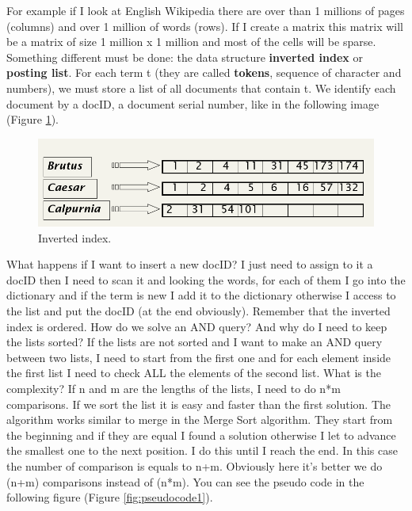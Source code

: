 For example if I look at English Wikipedia there are over than 1 millions of pages (columns) and over 1 million of words (rows). If I create a matrix this matrix will be a matrix of size 1 million x 1 million and most of the cells will be sparse.\newline
Something different must be done: the data structure \textbf{inverted index} or \textbf{posting list}. For each term t (they are called \textbf{tokens}, sequence of character and numbers), we must store a list of all documents that contain t. We identify each document by a docID, a document serial number, like in the following image (Figure \ref{fig:inverted}). 
\begin{figure}
    \centering
    \includegraphics[width=0.75\linewidth]{images/invertedindex.png}
    \caption{Inverted index.}
    \label{fig:inverted}
\end{figure}
What happens if I want to insert a new docID? I just need to assign to it a docID then I need to scan it and looking the words, for each of them I go into the dictionary and if the term is new I add it to the dictionary otherwise I access to the list and put the docID (at the end obviously). Remember that the inverted index is ordered.
How do we solve an AND query? And why do I need to keep the lists sorted? If the lists are not sorted and I want to make an AND query between two lists, I need to start from the first one and for each element inside the first list I need to check ALL the elements of the second list. What is the complexity? If n and m are the lengths of the lists, I need to do n*m comparisons.\newline
If we sort the list it is easy and faster than the first solution. The algorithm works similar to merge in the Merge Sort algorithm. They start from the beginning and if they are equal I found a solution otherwise I let to advance the smallest one to the next position. I do this until I reach the end. In this case the number of comparison is equals to n+m. Obviously here it's better we do (n+m) comparisons instead of (n*m).
You can see the pseudo code in the following figure (Figure \ref{fig:pseudocode1}).
